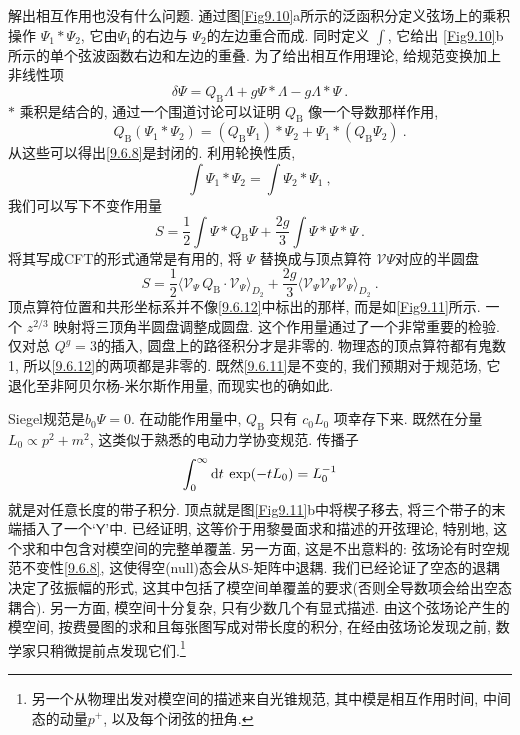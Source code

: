 解出相互作用也没有什么问题. 通过图\ref{Fig9.10}a所示的泛函积分定义弦场上的乘积操作 $\Psi_{1} * \Psi_{2}$, 
它由$\Psi_{1}$的右边与 $\Psi_{2}$的左边重合而成. 同时定义 $\int$, 它给出 \ref{Fig9.10}b所示的单个弦波函数右边和左边的重叠. 
为了给出相互作用理论, 给规范变换加上非线性项
\begin{equation}
	\delta \Psi=Q_{\mathrm{B}} \Lambda+g \Psi * \Lambda-g \Lambda * \Psi \:. \label{9.6.8}
\end{equation}
$*$ 乘积是结合的, 通过一个围道讨论可以证明 $Q_{\mathrm{B}}$ 像一个导数那样作用,
\begin{equation}
	Q_{\mathrm{B}}(\Psi_{1} * \Psi_{2})=(Q_{\mathrm{B}} \Psi_{1}) * \Psi_{2}+\Psi_{1} *(Q_{\mathrm{B}} \Psi_{2}) \:. \label{9.6.9}
\end{equation}
从这些可以得出\eqref{9.6.8}是封闭的. 利用轮换性质,
\begin{equation}
	\int \Psi_{1} * \Psi_{2}=\int \Psi_{2} * \Psi_{1} \:, \label{9.6.10}
\end{equation}
我们可以写下不变作用量
\begin{equation}
	S=\frac{1}{2} \int \Psi * Q_{\mathrm{B}} \Psi + \frac{2 g}{3} \int \Psi * \Psi * \Psi \:. \label{9.6.11}
\end{equation}
将其写成CFT的形式通常是有用的, 将 $\Psi$ 替换成与顶点算符 $\mathscr{V} \Psi$对应的半圆盘
\begin{equation}
	S=\frac{1}{2}\langle\mathscr{V}_{\Psi} \,Q_{\mathrm{B}} \cdot \mathscr{V}_{\Psi}\rangle_{D_{2}} + 
	\frac{2 g}{3}\langle\mathscr{V}_{\Psi} \mathscr{V}_{\Psi} \mathscr{V}_{\Psi}\rangle_{D_{2}} \:. \label{9.6.12}
\end{equation}
顶点算符位置和共形坐标系并不像\eqref{9.6.12}中标出的那样, 而是如\ref{Fig9.11}所示. 一个 $z^{2 / 3}$ 映射将三顶角半圆盘调整成圆盘. 
这个作用量通过了一个非常重要的检验. 仅对总 $Q^{g}=3$的插入, 圆盘上的路径积分才是非零的. 物理态的顶点算符都有鬼数1, 所以\eqref{9.6.12}的两项都是非零的. 
既然\eqref{9.6.11}是不变的, 我们预期对于规范场, 它退化至非阿贝尔杨-米尔斯作用量, 而现实也的确如此.


Siegel规范是$b_{0} \Psi=0 $. 在动能作用量中, $Q_{\mathrm{B}}$ 只有 $c_{0} L_{0}$ 项幸存下来. 
既然在分量 $L_{0} \propto p^{2}+m^{2}$, 这类似于熟悉的电动力学协变规范. 传播子
\begin{equation}
	\int_{0}^{\infty} \mathrm{d} t \: \exp (-t L_{0}) = L_{0}^{-1} \label{9.6.13}
\end{equation}
就是对任意长度的带子积分. 顶点就是图\ref{Fig9.11}b中将楔子移去, 将三个带子的末端插入了一个`$\mathsf{Y}$'中.
已经证明, 这等价于用黎曼面求和描述的开弦理论, 特别地, 这个求和中包含对模空间的完整单覆盖. 
另一方面, 这是不出意料的: 弦场论有时空规范不变性\eqref{9.6.8}, 这使得空(null)态会从S-矩阵中退耦. 
我们已经论证了空态的退耦决定了弦振幅的形式, 这其中包括了模空间单覆盖的要求(否则全导数项会给出空态耦合). 
另一方面, 模空间十分复杂, 只有少数几个有显式描述. 由这个弦场论产生的模空间, 按费曼图的求和且每张图写成对带长度的积分, 
在经由弦场论发现之前, 数学家只稍微提前点发现它们.\footnote{另一个从物理出发对模空间的描述来自光锥规范, 其中模是相互作用时间, 
中间态的动量$p^{+}$, 以及每个闭弦的扭角.}


